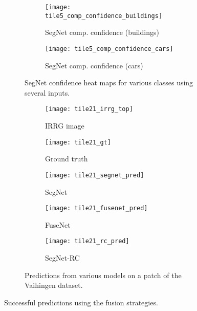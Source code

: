 \begin{figure}[!tb]
\begin{subfigure}{\textwidth}
        \begin{subfigure}{0.19\textwidth}
        	\texttt{[image: tile5\_comp\_confidence\_buildings]}
        	\caption*{SegNet comp. confidence (buildings)}
        \end{subfigure}
        \begin{subfigure}{0.19\textwidth}
        	\texttt{[image: tile5\_comp\_confidence\_cars]}
        	\caption*{SegNet comp. confidence (cars)}
        \end{subfigure}
        \caption{SegNet confidence heat maps for various classes using several inputs.}
        \label{fig:confidence_vaihingen_fusion}
    \end{subfigure}
    \begin{subfigure}{\textwidth}
    	\captionsetup[subfigure]{singlelinecheck=off,justification=centering}
  		\captionsetup[subfigure]{labelformat=empty}
    	\begin{subfigure}{0.19\textwidth}
        	\texttt{[image: tile21\_irrg\_top]}
      		\caption*{IRRG image}
        \end{subfigure}
        \begin{subfigure}{0.19\textwidth}
        	\texttt{[image: tile21\_gt]}
        	\caption*{Ground truth}
        \end{subfigure}
        \begin{subfigure}{0.19\textwidth}
        	\texttt{[image: tile21\_segnet\_pred]}
        	\caption*{SegNet}
        \end{subfigure}
        \begin{subfigure}{0.19\textwidth}
        	\texttt{[image: tile21\_fusenet\_pred]}
        	\caption*{FuseNet}
        \end{subfigure}
        \begin{subfigure}{0.19\textwidth}
        	\texttt{[image: tile21\_rc\_pred]}
        	\caption*{SegNet-RC}
        \end{subfigure}
        \caption{Predictions from various models on a patch of the Vaihingen dataset.}
        \label{fig:fusion_exemple2}
    \end{subfigure}

	\caption{Successful predictions using the fusion strategies.}
   	\label{fig:fusion_success}
\end{figure}


